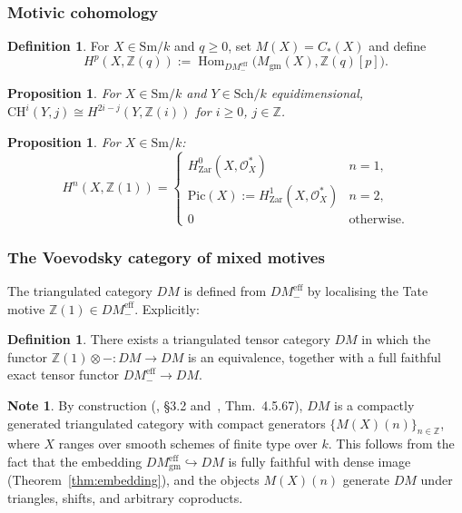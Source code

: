 \documentclass[12pt,a4paper]{article}
\newtheorem{proposition}[theorem]{Proposition}
\theoremstyle{definition}
\newtheorem{definition}[theorem]{Definition}
\newtheorem{note}[theorem]{Note}
\newcommand{\Sm}{\mathrm{Sm}}
\newcommand{\Sch}{\mathrm{Sch}}
\newcommand{\DMeff}{DM^{\mathrm{eff}}_{-}}
\newcommand{\Hom}{\operatorname{Hom}}
\newcommand{\CH}{\mathrm{CH}}
\newcommand{\Z}{\mathbb{Z}}
\begin{document}
\subsubsection{Motivic cohomology}

\begin{definition}\label{def:motivic-cohomology}
For $X\in\Sm/k$ and $q\geq 0$, set $M(X)=C_*(X)$ and define
\[
  H^p(X,\Z(q)) := \Hom_{DM^{\mathrm{eff}}_-}\bigl(M_{\mathrm{gm}}(X),\Z(q)[p]\bigr).
\]
\end{definition}

\begin{proposition}\label{prop:motivic-chow}
For $X\in\Sm/k$ and $Y\in\Sch/k$ equidimensional, $\CH^i(Y,j)\cong H^{2i-j}(Y,\Z(i))$
for $i\geq 0$, $j\in\Z$.
\end{proposition}

\begin{proposition}\label{prop:motivic-Z1}
For $X\in\Sm/k$:
\[
  H^n(X,\Z(1)) =
  \begin{cases}
    H^0_{\mathrm{Zar}}(X,\mathcal{O}_X^*) & n=1,\\
    \mathrm{Pic}(X):=H^1_{\mathrm{Zar}}(X,\mathcal{O}_X^*) & n=2,\\
    0 & \text{otherwise}.
  \end{cases}
\]
\end{proposition}

\subsubsection{The Voevodsky category of mixed motives}

The triangulated category $DM$ is defined from $\DMeff$ by localising the Tate motive
$\Z(1)\in\DMeff$.  Explicitly:

\begin{definition}\label{def:DM}
There exists a triangulated tensor category $DM$ in which the functor
$\Z(1)\otimes-:DM\to DM$ is an equivalence, together with a full faithful exact
tensor functor $\DMeff\to DM$.
\end{definition}

\begin{note}\label{note:DM-compactly-generated}
By construction (\cite{VSF00}, \S3.2 and~\cite{Ayo07}, Thm.\ 4.5.67), $DM$ is a
compactly generated triangulated category with compact generators
$\{M(X)(n)\}_{n\in\Z}$, where $X$ ranges over smooth schemes of finite type over $k$.
This follows from the fact that the embedding $DM^{\mathrm{eff}}_{\mathrm{gm}}\hookrightarrow DM$
is fully faithful with dense image (Theorem~\ref{thm:embedding}), and the objects
$M(X)(n)$ generate $DM$ under triangles, shifts, and arbitrary coproducts.
\end{note}
\end{document}
